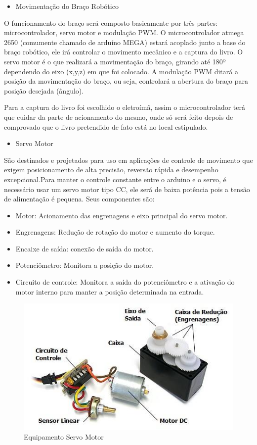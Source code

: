 \begin{itemize}
\item{Movimentação do Braço Robótico}
\end{itemize}

O funcionamento do braço será composto basicamente por três partes: microcontrolador, servo motor e modulação PWM. O microcontrolador atmega 2650 (comumente chamado de arduíno MEGA)  estará acoplado junto a base do braço robótico, ele irá controlar o movimento mecânico e a captura do livro. O servo motor é o que realizará a movimentação do braço, girando até 180º dependendo do eixo (x,y,z) em que foi colocado. A modulação PWM ditará a posição da movimentação do braço, ou seja, controlará a abertura do braço para posição desejada (ângulo).

Para a captura do livro foi escolhido o eletroímã, assim o microcontrolador terá que cuidar da parte de acionamento do mesmo, onde só será feito depois de comprovado que o livro pretendido de fato está no local estipulado.

\begin{itemize}
\item{Servo Motor}
\end{itemize}

São destinados e projetados para uso em aplicações de controle de movimento que exigem posicionamento de alta precisão, reversão rápida e desempenho excepcional.Para manter o controle constante entre o arduino e o servo, é necessário usar um servo motor tipo CC, ele será de baixa potência pois a tensão de alimentação é pequena. Seus componentes são:

\begin{itemize}
\item Motor: Acionamento das engrenagens e eixo principal do servo motor.
\item Engrenagens: Redução de rotação do motor e aumento do torque.
\item Encaixe de saída: conexão de saída do motor.
\item Potenciômetro: Monitora a posição do motor.
\item Circuito de controle: Monitora a saída do potenciômetro e a ativação do motor interno para manter a posição determinada na entrada.
\end{itemize}

\begin{figure}[!h]
\centering
\includegraphics[scale=0.65, angle = 360]{figuras/lala2}
\caption[]{Equipamento Servo Motor}
\end{figure}
\FloatBarrier

